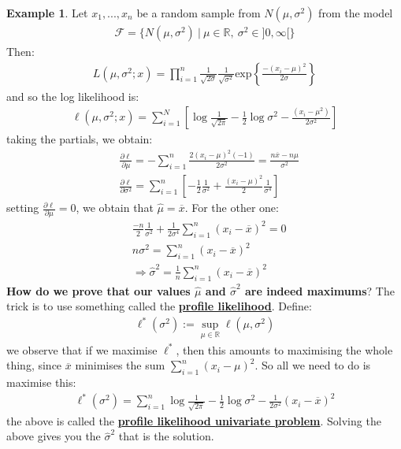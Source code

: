 \documentclass[11pt]{scrartcl}
\newcommand{\R}[0]{\mathbb{R}}
\theoremstyle{definition}
\newtheorem{ex}{Example}
\theoremstyle{remark}
\newcommand{\dfn}[1]{\textbf{\underline{#1}}}
\newcommand{\dist}[0]{\mathcal{F}}
\begin{document}
{\begin{ex} 
	Let $x_1, ..., x_n$ be a random sample from $N(\mu, \sigma^2)$ from the model
	\begin{align*}
		\dist = \{ N(\mu, \sigma^2)\ |\ \mu \in \R,\ \sigma^2 \in ]0, \infty[ \} 	
	\end{align*}
	Then: 
	\begin{align*}
		L(\mu, \sigma^2; x) = \prod_{i=1}^n \frac{1}{\sqrt{ 2 \sigma}} \frac{1}{\sqrt{\sigma^2} } \text{exp} \left\{ \frac{-(x_i - \mu)^2}{2 \sigma}		\right\} 	
	\end{align*}
	and so the log likelihood is: 
	\begin{align*}
		\ell(\mu, \sigma^2; x ) = \sum_{i=1}^N \left[ \log \frac{1}{\sqrt{2 \pi}} - \frac{1}{2} \log \sigma^2 - \frac{(x_i - \mu^2)}{2 \sigma^2}	\right] 
	\end{align*}
	taking the partials, we obtain: 
	\begin{align*}
		& \frac{\partial \ell}{\partial \mu} = - \sum_{i=1}^n \frac{2 (x_i -  \mu)^2 (-1)}{2 \sigma^2}	 = \frac{n \overline{x} - n \mu}{\sigma^2} \\
		& \frac{\partial \ell}{\partial \sigma^2} = \sum_{i=1}^n \left[ 		-\frac{1}{2} \frac{1}{\sigma^2} + \frac{(x_i - \mu)^2}{2} \frac{1}{\sigma^4} \right] 
	\end{align*}
	setting $\frac{\partial \ell}{\partial \mu} =0$, we obtain that $\hat{\mu} = \overline{x}$. For the other one: 
	\begin{align*}
		& \frac{-n}{2} \frac{1}{\sigma^2} + \frac{1}{2 \sigma^4} \sum_{i=1}^n (x_i - \overline{x} )^2 = 0  \\
		& n \sigma^2 = \sum_{i=1}^n (x_i - \overline{x})^2 \\
		& \Rightarrow \hat{\sigma}^2 = \frac{1}{n} \sum_{i=1}^n (x_i - \overline{x})^2		
	\end{align*}
	\textbf{How do we prove that our values $\hat{\mu}$ and $\hat{\sigma}^2$ are indeed maximums}? The trick is to use something called the \dfn{profile likelihood}. Define: 
	\begin{align}
		\ell^*(\sigma^2) := \sup_{\mu \in \R} \ell (\mu, \sigma^2) 
	\end{align}
	we observe that if we maximise $\ell^*$, then this amounts to maximising the whole thing, since $\overline{x}$ minimises the sum $\sum_{i=1}^n (x_i - \mu)^2$. So all we need to do is maximise this:
	\begin{align*}
			\ell^*(\sigma^2) = \sum_{i=1}^n \log \frac{1}{\sqrt{2 \pi}} - \frac{1}{2} \log \sigma^2 - \frac{1}{2 \sigma^2} (x_i - \overline{x})^2
	\end{align*}
 	the above is called the \dfn{profile likelihood univariate problem}. Solving the above gives you the $\hat{\sigma}^2$ that is the solution. 
\end{ex}

}
\end{document}
